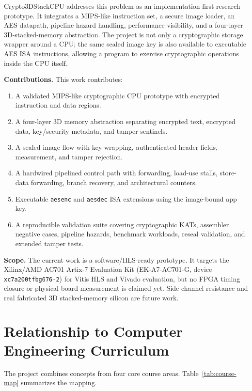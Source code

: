 \documentclass[conference]{IEEEtran}
\begin{document}
Crypto3DStackCPU addresses this problem as an implementation-first research prototype. It integrates a MIPS-like instruction set, a secure image loader, an AES datapath, pipeline hazard handling, performance visibility, and a four-layer 3D-stacked-memory abstraction. The project is not only a cryptographic storage wrapper around a CPU; the same sealed image key is also available to executable AES ISA instructions, allowing a program to exercise cryptographic operations inside the CPU itself.

\textbf{Contributions.} This work contributes:
\begin{enumerate}
    \item A validated MIPS-like cryptographic CPU prototype with encrypted instruction and data regions.
    \item A four-layer 3D memory abstraction separating encrypted text, encrypted data, key/security metadata, and tamper sentinels.
    \item A sealed-image flow with key wrapping, authenticated header fields, measurement, and tamper rejection.
    \item A hardwired pipelined control path with forwarding, load-use stalls, store-data forwarding, branch recovery, and architectural counters.
    \item Executable \texttt{aesenc} and \texttt{aesdec} ISA extensions using the image-bound app key.
    \item A reproducible validation suite covering cryptographic KATs, assembler negative cases, pipeline hazards, benchmark workloads, reseal validation, and extended tamper tests.
\end{enumerate}

\textbf{Scope.} The current work is a software/HLS-ready prototype. It targets the Xilinx/AMD AC701 Artix-7 Evaluation Kit (EK-A7-AC701-G, device \texttt{xc7a200tfbg676-2}) for Vitis HLS and Vivado evaluation, but no FPGA timing closure or physical board measurement is claimed yet. Side-channel resistance and real fabricated 3D stacked-memory silicon are future work.

\section{Relationship to Computer Engineering Curriculum}

The project combines concepts from four core course areas. Table~\ref{tab:course-map} summarizes the mapping.
\end{document}
